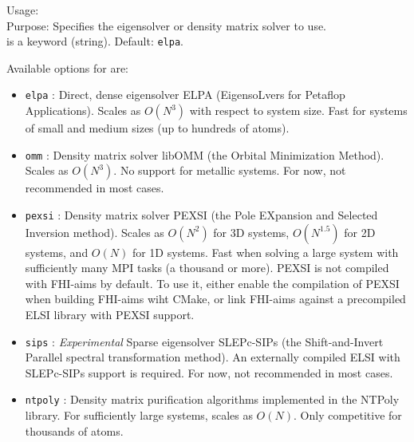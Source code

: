 {
  \noindent
  Usage:   \\[1.0ex]
  Purpose: Specifies the eigensolver or density matrix solver to use. \\[1.0ex]
   is a keyword (string). Default: \texttt{elpa}. \\
}

Available options for  are:
\begin{itemize}
  \item \texttt{elpa} : Direct, dense eigensolver ELPA (EigensoLvers for
    Petaflop Applications). Scales as $O(N^3)$ with respect to system size.
    Fast for systems of small and medium sizes (up to hundreds of atoms).
  \item \texttt{omm} : Density matrix solver libOMM (the Orbital Minimization
    Method). Scales as $O(N^3)$. No support for metallic systems. For now, not
    recommended in most cases.
  \item \texttt{pexsi} : Density matrix solver PEXSI (the Pole EXpansion and
    Selected Inversion method). Scales as $O(N^2)$ for 3D systems, $O(N^{1.5})$
    for 2D systems, and $O(N)$ for 1D systems. Fast when solving a large system
    with sufficiently many MPI tasks (a thousand or more). PEXSI is not compiled
    with FHI-aims by default. To use it, either enable the compilation of PEXSI
    when building FHI-aims wiht CMake, or link FHI-aims against a precompiled
    ELSI library with PEXSI support.
  \item \texttt{sips} : \emph{Experimental} Sparse eigensolver SLEPc-SIPs (the
    Shift-and-Invert Parallel spectral transformation method). An externally
    compiled ELSI with SLEPc-SIPs support is required. For now, not recommended
    in most cases.
  \item \texttt{ntpoly} : Density matrix purification algorithms implemented in
    the NTPoly library. For sufficiently large systems, scales as $O(N)$. Only
    competitive for thousands of atoms.
\end{itemize}

